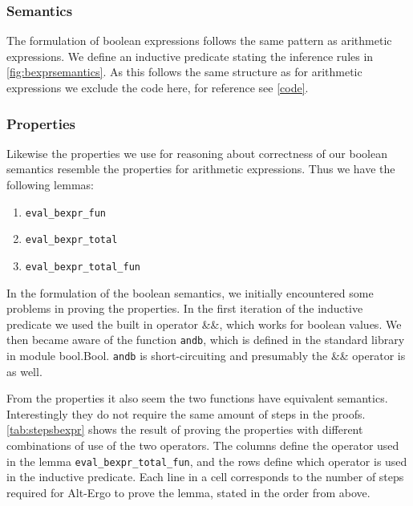 \subsubsection{Semantics}
The formulation of boolean expressions follows the same pattern as arithmetic expressions.
We define an inductive predicate stating the inference rules in \autoref{fig:bexprsemantics}.
As this follows the same structure as for arithmetic expressions we exclude the code here,
for reference see \cref{code}.

\subsubsection{Properties}
Likewise the properties we use for reasoning about correctness of our boolean semantics resemble the properties for arithmetic expressions. Thus we have the following lemmas:

\begin{enumerate}
  \item \texttt{eval\_bexpr\_fun}
  \item \texttt{eval\_bexpr\_total}
  \item \texttt{eval\_bexpr\_total\_fun}
\end{enumerate}

In the formulation of the boolean semantics, we initially encountered some problems in proving the properties.
In the first iteration of the inductive predicate we used the built in operator \&\&, which works for boolean values.
We then became aware of the function \texttt{andb}, which is defined in the standard library in module bool.Bool.
\texttt{andb} is short-circuiting and presumably the \&\& operator is as well.

From the properties it also seem the two functions have equivalent semantics.
Interestingly they do not require the same amount of steps in
the proofs. \autoref{tab:stepsbexpr} shows the result of proving the properties with different combinations of use of the two operators.
The columns define the operator used in the lemma \texttt{eval\_bexpr\_total\_fun},
and the rows define which operator is used in the inductive predicate.
Each line in a cell corresponds to the number of steps required for Alt-Ergo to prove the lemma, stated in the order from above.

